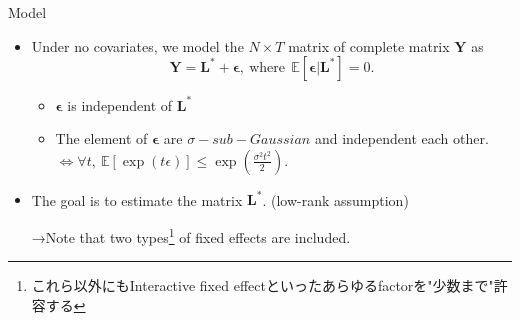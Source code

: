 \documentclass[xcolor=svgnames,aspectratio=169]{beamer}
\newcommand{\E}{\mathbb{E}}
\begin{document}
\begin{frame}{Model}
    \begin{itemize}
        \item Under no covariates, we model the $N\times T$ matrix of complete matrix $\mathbf{Y}$ as
        \[
        \mathbf{Y}=\mathbf{L^*}+\mathbf{\epsilon}, \ \text{where} \ \ \E[\mathbf{\epsilon}|\mathbf{L^*}]=0.
        \]
    \begin{tcolorbox}[colframe=lightgray,title=Assumption 1]
        \begin{itemize}
            \item $\mathbf{\epsilon}$ is independent of $\mathbf{L^*}$
            \item The element of $\mathbf{\epsilon}$ are $\sigma-sub-Gaussian$ and independent each other.
            $\Leftrightarrow \forall t, \ \E[\exp (t\epsilon)]\leq \exp (\frac{\sigma^2t^2}{2}).$
        \end{itemize}
    \end{tcolorbox}
        \item The goal is to estimate the matrix $\mathbf{L^*}$. (low-rank assumption) 
    
        →Note that two types\footnote{これら以外にもInteractive fixed effectといったあらゆるfactorを"少数まで"許容する} of fixed effects are included.
    \end{itemize}
\end{frame}
\end{document}
